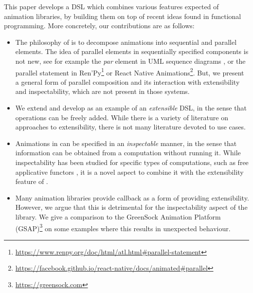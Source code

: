 This paper develops a DSL which combines various features expected of animation libraries, by building them on top of recent ideas found in functional programming. More concretely, our contributions are as follows:
\begin{itemize}
\item The philosophy of \dsl{} is to decompose animations into sequential and parallel elements. The idea of parallel elements in sequentially specified components is not new, see for example the \emph{par} element in UML sequence diagrams \cite{umlspec}, or the parallel statement in Ren'Py\footnote{\url{https://www.renpy.org/doc/html/atl.html#parallel-statement}} or React Native Animations\footnote{\url{https://facebook.github.io/react-native/docs/animated#parallel}}. But, we present a general form of parallel composition and its interaction with extensibility and inspectability, which are not present in those systems.
\item We extend and develop \dsl{} as an example of an \emph{extensible} DSL, in the sense that operations can be freely added. While there is a variety of literature on approaches to extensibility, there is not many literature devoted to use cases.
\item Animations in \dsl{} can be specified in an \emph{inspectable} manner, in the sense that information can be obtained from a computation without running it. While inspectability has been studied for specific types of computations, such as free applicative functors \cite{DBLP:journals/corr/CapriottiK14}, it is a novel aspect to combine it with the extensibility feature of \dsl{}.
\item Many animation libraries provide callback as a form of providing extensibility. However, we argue that this is detrimental for the inspectability aspect of the library. We give a comparison to the GreenSock Animation Platform (GSAP)\footnote{\url{https://greensock.com}} on some examples where this results in unexpected behaviour.
\end{itemize}
